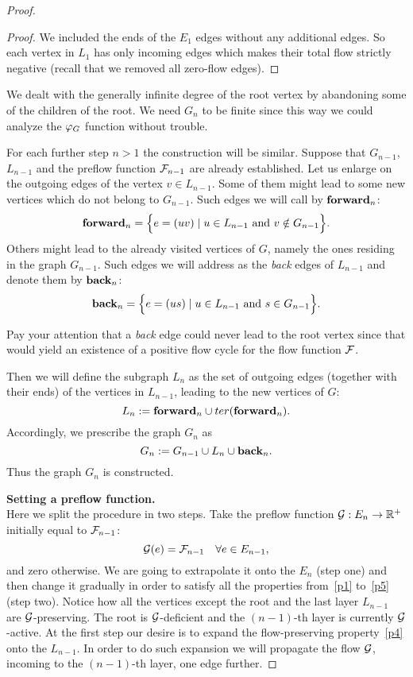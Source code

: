 \documentclass[12pt]{article}
\begin{document}
\begin{proof}
\begin{proof}
        We included the ends of the $E_1$ edges without any additional edges.
        So each vertex in $L_1$ has only incoming edges which makes their total flow strictly negative (recall that we removed all zero-flow edges).
      \end{proof}
      \begin{note}
        We dealt with the generally infinite degree of the root vertex by abandoning some of the children of the root.
        We need $G_n$ to be finite since this way we could analyze the $\gfi$ function without trouble.
      \end{note}
      For each further step $n > 1$ the construction will be similar.
      Suppose that $G_{n-1}$, $L_{n-1}$ and the preflow function $\flowposn{n-1}$ are already established.
      Let us enlarge on the outgoing edges of the vertex $v \in L_{n-1}$.
      Some of them might lead to some new vertices which do not belong to $G_{n-1}$.
      Such edges we will call by $\efor_n$:
      \[
        \efor_n = \Big\{ e = (uv) \mid u \in L_{n-1} \text{ and } v \notin G_{n-1}\Big\}.
      \]
      Others might lead to the already visited vertices of $G$, namely the ones residing in the graph $G_{n-1}$.
      Such edges we will address as the \emph{back} edges of $L_{n-1}$ and denote them by $\eback_n$:
      \[
        \eback_n = \Big\{e = (us) \mid u \in L_{n-1} \text{ and } s \in G_{n-1}\Big\}.
      \]
      \begin{remark}
        Pay your attention that a \emph{back} edge could never lead to the root vertex since that
          would yield an existence of a positive flow cycle for the flow function $\flowpos$.
      \end{remark}
      Then we will define the subgraph $L_n$ as the set of outgoing edges (together with their ends) of the vertices in $L_{n-1}$,
        leading to the new vertices of $G$:
      \[
        L_n := \efor_n \cup \ter(\efor_n).
      \]
      Accordingly, we prescribe the graph $G_n$ as
      \[
        G_n := G_{n-1} \cup L_n \cup \eback_n.
      \]
      Thus the graph $G_n$ is constructed.

      \noindent\textbf{Setting a preflow function.}\\
      \noindent Here we split the procedure in two steps.
      Take the preflow function $\cal{G}: E_n \to \mathbb{R}^{+}$ initially equal to $\flowposn{n-1}$:
      \[
        \cal{G}(e) = \flowposn{n-1} \quad \forall e \in E_{n-1},
      \]
      and zero otherwise.
      We are going to extrapolate it onto the $E_n$ (step one) and then change it gradually in order
        to satisfy all the properties from~\ref{p1} to~\ref{p5} (step two).
      Notice how all the vertices except the root and the last layer $L_{n-1}$ are $\cal{G}$-preserving.
      The root is $\cal{G}$-deficient and the $(n-1)$-th layer is currently $\cal{G}$-active.
      At the first step our desire is to expand the flow-preserving property~\ref{p4} onto the $L_{n-1}$.
      In order to do such expansion we will propagate the flow $\cal{G}$, incoming to the $(n-1)$-th layer, one edge further.


\end{proof}
\end{document}
